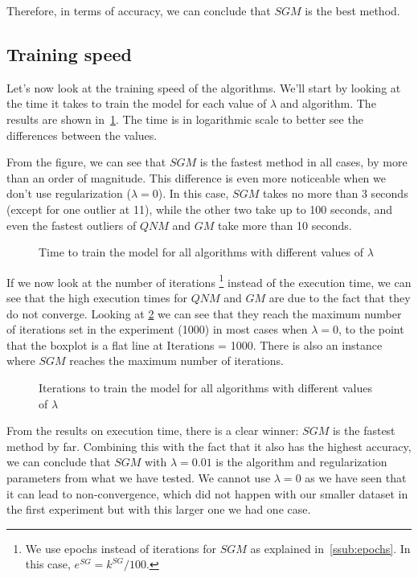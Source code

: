 Therefore, in terms of accuracy, we can conclude that $SGM$ is the best method.

\pagebreak
\subsection{Training speed}

Let's now look at the training speed of the algorithms. We'll start by looking
at the time it takes to train the model for each value of $\lambda$ and
algorithm. The results are shown in~\cref{fig:lambda_time_2}. The time
is in logarithmic scale to better see the differences between the values.

From the figure, we can see that $SGM$ is the fastest method in all cases, by more
than an order of magnitude. This difference is even more noticeable when
we don't use regularization ($\lambda = 0$). In this case, $SGM$ takes
no more than 3 seconds (except for one outlier at 11), while the other
two take up to 100 seconds, and even the fastest outliers of
$QNM$ and $GM$ take more than 10 seconds.

\begin{figure}[H]
    
    \caption{Time to train the model for all algorithms with different values of $\lambda$}
    \label{fig:lambda_time_2}
\end{figure}

If we now look at the number of iterations%
\footnote{We use epochs instead of iterations for $SGM$ as explained in~\cref{ssub:epochs}.
In this case, ${e^{SG} = k^{SG}/100}$.}
instead of the execution time, we can see that the high execution times for
$QNM$ and $GM$ are due to the fact that they do not converge. Looking at
\cref{fig:lambda_nie_2} we can see that they reach
the maximum number of iterations set in the experiment (1000) in most cases
when $\lambda = 0$, to the point that the boxplot is a flat line at Iterations = 1000.
There is also an instance where $SGM$ reaches the maximum number of iterations.

\begin{figure}[H]
    
    \caption{Iterations to train the model for all algorithms with different values of $\lambda$}
    \label{fig:lambda_nie_2}
\end{figure}

From the results on execution time, there is a clear winner: $SGM$ is the fastest
method by far. Combining this with the fact that it also has the highest accuracy,
we can conclude that $SGM$ with $\lambda = 0.01$ is the algorithm and regularization
parameters from what we have tested. We cannot use $\lambda = 0$ as we have seen that
it can lead to non-convergence, which did not happen with our smaller dataset in the
first experiment but with this larger one we had one case.

